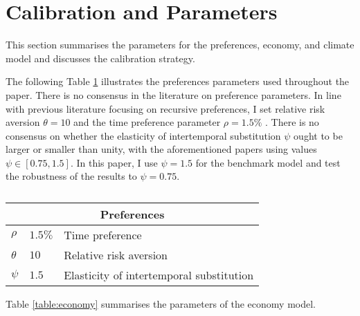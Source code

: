 \documentclass[../../main.tex]{subfiles}
\begin{document}
\section{Calibration and Parameters} \label{appendix:calibration}

This section summarises the parameters for the preferences, economy, and climate model and discusses the calibration strategy.

The following Table \ref{table:preferences} illustrates the preferences parameters used throughout the paper. There is no consensus in the literature on preference parameters. In line with previous literature focusing on recursive preferences, I set relative risk aversion $\theta = 10$ \citep{ackerman_epsteinzin_2013,crost_optimal_2013,lontzek_stochastic_2015} and the time preference parameter $\rho = 1.5\%$ \citep{nordhaus_estimates_2014}. There is no consensus on whether the elasticity of intertemporal substitution $\psi$ ought to be larger or smaller than unity, with the aforementioned papers using values $\psi \in [0.75, 1.5]$. In this paper, I use $\psi = 1.5$ for the benchmark model and test the robustness of the results to $\psi = 0.75$.

\begin{table}[htbp]
    \centering
    \begin{tabular}{ |p{1cm}||p{3cm}|p{8cm}|}
        \hline
        \multicolumn{3}{|c|}{Preferences} \\
        \hline
        $\rho$ & $1.5\%$ & Time preference \\
        $\theta$ & $10$ & Relative risk aversion \\
        $\psi$ & $1.5$ & Elasticity of intertemporal substitution \\
        \hline
    \end{tabular}
    \caption{}
    \label{table:preferences}
\end{table}

Table \ref{table:economy} summarises the parameters of the economy model. %
\end{document}
